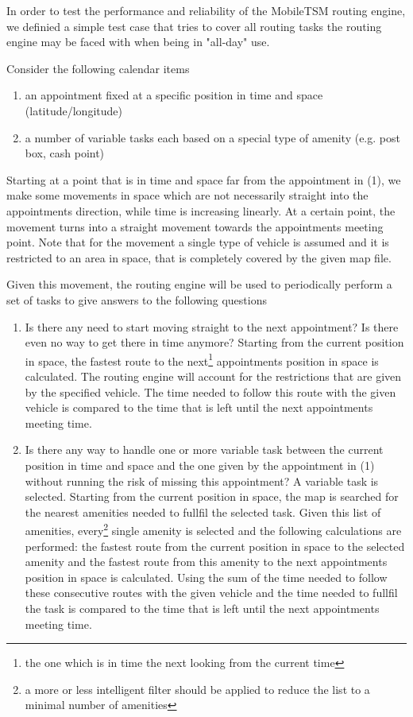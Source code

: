 In order to test the performance and reliability of the MobileTSM routing engine, we definied a simple test case that tries to cover all routing tasks the routing engine may be faced with when being in "all-day" use.\newline

Consider the following calendar items
\begin{enumerate}
	\item an appointment fixed at a specific position in time and space (latitude/longitude)
	\item a number of variable tasks each based on a special type of amenity (e.g. post box, cash point)
\end{enumerate}

Starting at a point that is in time and space far from the appointment in (1), we make some movements in space which are not necessarily straight into the appointments direction, while time is increasing linearly. At a certain point, the movement turns into a straight movement towards the appointments meeting point. Note that for the movement a single type of vehicle is assumed and it is restricted to an area in space, that is completely covered by the given map file.\newline

Given this movement, the routing engine will be used to periodically perform a set of tasks to give answers to the following questions
\begin{enumerate}
	\item Is there any need to start moving straight to the next appointment? Is there even no way to get there in time anymore?\newline
	Starting from the current position in space, the fastest route to the next\footnote{the one which is in time the next looking from the current time} appointments position in space is calculated. The routing engine will account for the restrictions that are given by the specified vehicle. The time needed to follow this route with the given vehicle is compared to the time that is left until the next appointments meeting time.
	
	\item Is there any way to handle one or more variable task between the current position in time and space and the one given by the appointment in (1) without running the risk of missing this appointment?\newline
	A variable task is selected. Starting from the current position in space, the map is searched for the nearest amenities needed to fullfil the selected task. Given this list of amenities, every\footnote{a more or less intelligent filter should be applied to reduce the list to a minimal number of amenities} single amenity is selected and the following calculations are performed: the fastest route from the current position in space to the selected amenity and the fastest route from this amenity to the next appointments position in space is calculated. Using the sum of the time needed to follow these consecutive routes with the given vehicle and the time needed to fullfil the task is compared to  the time that is left until the next appointments meeting time.
\end{enumerate}

